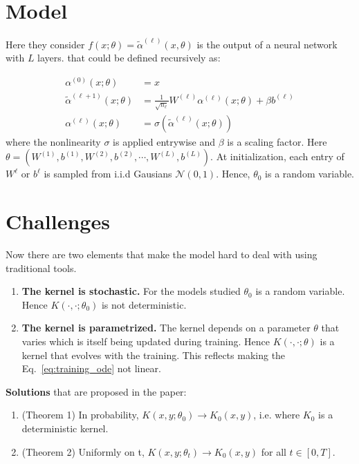 \documentclass[a4paper,10pt]{article}
\begin{document}
\section{Model}

Here they consider $f(x; \theta) = \tilde\alpha^{(\ell)} (x, \theta)$ is the output of a neural network with $L$ layers. that could be defined recursively as:

\begin{equation}
\begin{aligned}
\alpha^{(0)}(x ; \theta) &=x \\
\tilde{\alpha}^{(\ell+1)}(x ; \theta) &=\frac{1}{\sqrt{n_{\ell}}} W^{(\ell)} \alpha^{(\ell)}(x ; \theta)+\beta b^{(\ell)} \\
\alpha^{(\ell)}(x ; \theta) &=\sigma\left(\tilde{\alpha}^{(\ell)}(x ; \theta)\right)
\end{aligned}
\end{equation}
where the nonlinearity $\sigma$ is applied entrywise and $\beta$ is a scaling factor. Here $\theta = ( W^{(1)},   b^{(1)},  W^{(2)},   b^{(2)}, \cdots,  W^{(L)},   b^{(L)})$. At initialization, each entry of $ W^{\ell}$  or $b^{\ell}$ is sampled from i.i.d Gausians $\mathcal{N}(0, 1)$. Hence, $\theta_0$ is a random variable. 



\section{Challenges}

Now there are two elements that make the model hard to deal with using traditional tools.
\begin{enumerate}
\item \textbf{The kernel is stochastic.} For the models studied $\theta_0$  is a random variable.
  Hence $K(\cdot, \cdot; \theta_0)$ is  not deterministic.
\item \textbf{The kernel is parametrized.} The kernel depends on a parameter $\theta$ that varies which is itself being updated during training.  Hence $K(\cdot, \cdot; \theta)$  is a kernel that evolves with the training. This reflects making the Eq.~\ref{eq:training_ode} not linear.
\end{enumerate}

\noindent
\textbf{Solutions} that are proposed in the paper:
\begin{enumerate}
\item  (Theorem 1) In probability, $K(x, y; \theta_0) \rightarrow K_0(x, y)$, i.e. where $K_0$ is a deterministic kernel.
\item (Theorem 2)  Uniformly on t, $K(x, y; \theta_t) \rightarrow K_0(x, y)$ for all $t \in [0, T]$.
\end{enumerate}
\end{document}
